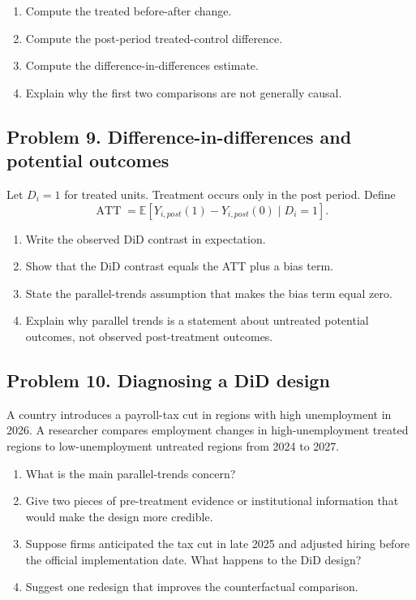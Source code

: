 \documentclass[11pt]{article}
\newcommand{\E}{\mathbb{E}}
\newcommand{\ATT}{\operatorname{ATT}}
\begin{document}
\begin{enumerate}[label=(\alph*)]
\item Compute the treated before-after change.
\item Compute the post-period treated-control difference.
\item Compute the difference-in-differences estimate.
\item Explain why the first two comparisons are not generally causal.
\end{enumerate}

\subsection*{Problem 9. Difference-in-differences and potential outcomes}

Let $D_i=1$ for treated units. Treatment occurs only in the post period. Define
\[
\ATT=\E[Y_{i,post}(1)-Y_{i,post}(0)\mid D_i=1].
\]

\begin{enumerate}[label=(\alph*)]
\item Write the observed DiD contrast in expectation.
\item Show that the DiD contrast equals the ATT plus a bias term.
\item State the parallel-trends assumption that makes the bias term equal zero.
\item Explain why parallel trends is a statement about untreated potential outcomes, not observed post-treatment outcomes.
\end{enumerate}

\subsection*{Problem 10. Diagnosing a DiD design}

A country introduces a payroll-tax cut in regions with high unemployment in 2026. A researcher compares employment changes in high-unemployment treated regions to low-unemployment untreated regions from 2024 to 2027.

\begin{enumerate}[label=(\alph*)]
\item What is the main parallel-trends concern?
\item Give two pieces of pre-treatment evidence or institutional information that would make the design more credible.
\item Suppose firms anticipated the tax cut in late 2025 and adjusted hiring before the official implementation date. What happens to the DiD design?
\item Suggest one redesign that improves the counterfactual comparison.
\end{enumerate}
\end{document}
